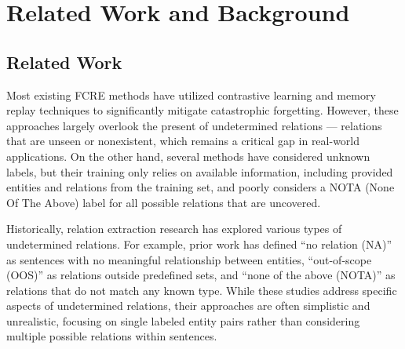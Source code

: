 \section{Related Work and Background}
\subsection{Related Work}
Most existing FCRE methods \citep{DBLP:conf/acl/WangWH23, hu-etal-2022-improving, DBLP:conf/coling/MaHL024, tran-etal-2024-preserving} have utilized contrastive learning and memory replay techniques to significantly mitigate catastrophic forgetting. However, these approaches largely overlook the present of undetermined relations — relations that are unseen or nonexistent, which remains a critical gap in real-world applications. On the other hand, several methods \citep{WANG2023151, zhao-etal-2025-dynamic, zhao-etal-2023-open, meng-etal-2023-rapl} have considered unknown labels, but their training only relies on available information, including provided entities and relations from the training set, and poorly considers a NOTA (None Of The Above) label for all possible relations that are uncovered. 

Historically, relation extraction research has explored various types of undetermined relations. For example, prior work has defined “no relation (NA)” \citep{xie-etal-2021-revisiting} as sentences with no meaningful relationship between entities, “out-of-scope (OOS)” \citep{liu-etal-2023-novel} as relations outside predefined sets, and “none of the above (NOTA)” \citep{zhao-etal-2023-open} as relations that do not match any known type. While these studies address specific aspects of undetermined relations, their approaches are often simplistic and unrealistic, focusing on single labeled entity pairs rather than considering multiple possible relations within sentences.

